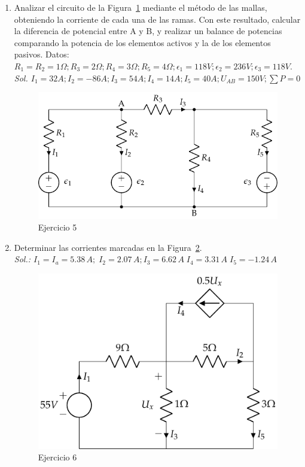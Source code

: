 \documentclass[11pt]{book} %
\begin{document}
\begin{enumerate}
 	\item Analizar el circuito de la Figura~\ref{fig.mallas2} mediante el método de las mallas, obteniendo la corriente de cada una de las ramas. Con este resultado, calcular la diferencia de potencial entre A y B, y realizar un balance de potencias comparando la potencia de los elementos activos y la de los elementos pasivos. Datos: $R_1 = R_2 = {1}\Omega; R_3 = {2}\Omega; R_4 = {3}\Omega; R_5={4}\Omega; \epsilon_1={118} V; \epsilon_2 = 236V; \epsilon_3 = {118}V$.\\
 	\emph{Sol. $I_1 = {32}A; I_2 = {-86} A; I_3 ={54}A; I_4 = {14}A; I_5 = {40}A; U_{AB}=150V; \sum P=0$}
 	\begin{figure}[h!]
 	    \centering
 	    \includegraphics{../figs/mallas2.pdf}
 	    \caption{Ejercicio 5}
 	    \label{fig.mallas2}
 	\end{figure}
 	
\item Determinar las corrientes marcadas en la Figura~\ref{fig.ej13_BT1}.\\
\emph{Sol.: $I_1=I_a=5.38\,A;\;I_2=2.07\,A; I_3=6.62\,A\; I_4=3.31\,A\;     I_5=-1.24\,A$}
\begin{figure}[h!]
    \centering
    \includegraphics{../figs/ej13_BT1.pdf}
    \caption{Ejercicio 6}
    \label{fig.ej13_BT1}
\end{figure}


\end{enumerate}
\end{document}
